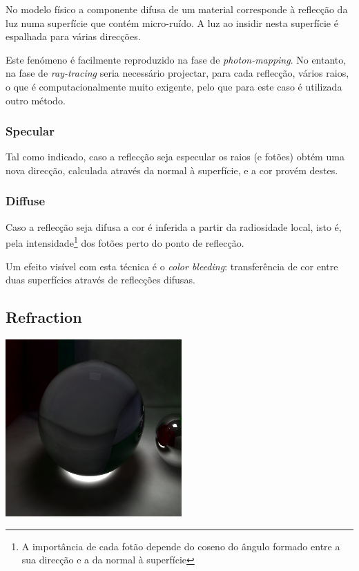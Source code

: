 \documentclass[a4paper]{article}
\begin{document}
\indent No modelo físico a componente difusa de um material corresponde à reflecção da luz numa superfície
que contém micro-ruído. A luz ao insidir nesta superfície é espalhada para várias direcções. 

\indent Este fenómeno é facilmente reproduzido na fase de \emph{photon-mapping}.
No entanto, na fase de \emph{ray-tracing} seria necessário projectar, para cada reflecção, vários raios, o que
é computacionalmente muito exigente, pelo que para este caso é utilizada outro método.

\subsubsection{Specular}
\indent \indent Tal como indicado, caso a reflecção seja especular os raios (e fotões) obtém uma nova direcção,
calculada através da normal à superfície, e a cor provém destes. 

\subsubsection{Diffuse}
\indent Caso a reflecção seja difusa a cor é inferida a partir da radiosidade local,
isto é, pela intensidade\footnote[1]{A importância de cada fotão depende do coseno do ângulo formado entre a sua direcção e a da normal à superfície} dos fotões perto do ponto de reflecção.

\indent Um efeito visível com esta técnica é o \emph{color bleeding}: transferência de cor entre duas superfícies
através de reflecções difusas.

\cleardoublepage
\subsection{Refraction}
\begin{center}
	\includegraphics[scale=0.50]{images/caustics.png}
	\label{fig:caustics}
\end{center}
\end{document}
